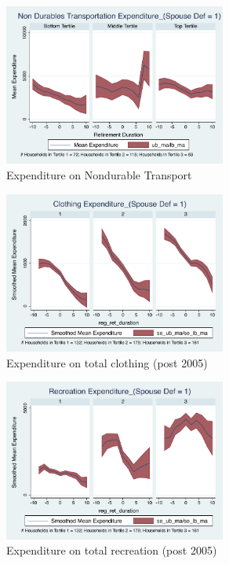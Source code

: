 \documentclass[11pt,onecolumn]{article}
\numberwithin{figure}{section}
\begin{document}
\begin{figure}[h]
	\caption{Expenditure on Nondurable Transport}
	\centering
	\includegraphics[width=0.65\textwidth]{../ConsumptionPostRetirement_by_SpouseDef_Cats/Smoothed/1/spouse_def_total_transport_real.pdf}
\end{figure}
\clearpage

\begin{figure}[h]
	\caption{Expenditure on total clothing (post 2005)}
	\centering
	\includegraphics[width=0.65\textwidth]{../ConsumptionPostRetirement_by_SpouseDef_Cats/Smoothed/1/spouse_def_total_clothing_2005_real.pdf}
\end{figure}

\begin{figure}[h]
	\caption{Expenditure on total recreation (post 2005)}
	\centering
	\includegraphics[width=0.65\textwidth]{../ConsumptionPostRetirement_by_SpouseDef_Cats/Smoothed/1/spouse_def_total_recreation_2005_real.pdf}
\end{figure}
\end{document}
